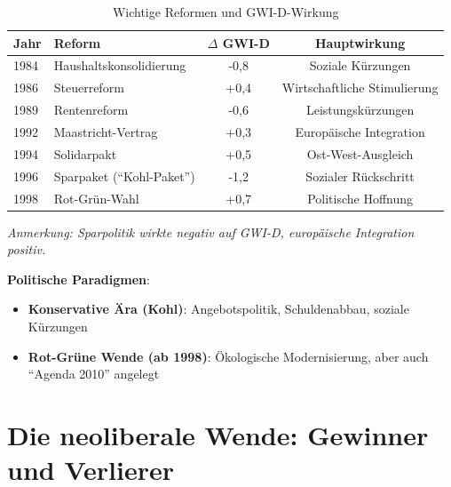\begin{table}[ht]
    \centering
    \caption{Wichtige Reformen und GWI-D-Wirkung}
    \label{tab:reformen_konsolidierung}
    \begin{tabular}{llcc}
        \toprule
        \textbf{Jahr} & \textbf{Reform} & \textbf{$\Delta$ GWI-D} & \textbf{Hauptwirkung} \\
        \midrule
        1984 & Haushaltskonsolidierung & -0,8 & Soziale Kürzungen \\
        1986 & Steuerreform & +0,4 & Wirtschaftliche Stimulierung \\
        1989 & Rentenreform & -0,6 & Leistungskürzungen \\
        1992 & Maastricht-Vertrag & +0,3 & Europäische Integration \\
        1994 & Solidarpakt & +0,5 & Ost-West-Ausgleich \\
        1996 & Sparpaket (\enquote{Kohl-Paket}) & -1,2 & Sozialer Rückschritt \\
        1998 & Rot-Grün-Wahl & +0,7 & Politische Hoffnung \\
        \bottomrule
    \end{tabular}
\end{table}

\begin{flushleft}
\footnotesize{\textit{Anmerkung: Sparpolitik wirkte negativ auf GWI-D, europäische Integration positiv.}}
\end{flushleft}

\textbf{Politische Paradigmen}:
\begin{itemize}
    \item \textbf{Konservative Ära (Kohl)}: Angebotspolitik, Schuldenabbau, soziale Kürzungen
    \item \textbf{Rot-Grüne Wende (ab 1998)}: Ökologische Modernisierung, aber auch \enquote{Agenda 2010} angelegt
\end{itemize}

\section{Die neoliberale Wende: Gewinner und Verlierer}

